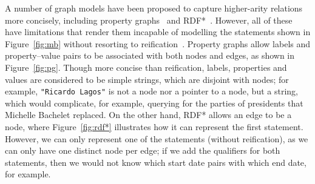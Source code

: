 A number of graph models have been proposed to capture higher-arity relations more concisely, including property graphs~\cite{FrancisGGLLMPRS18} and RDF*~\cite{Hartig17}. However, all of these have limitations that render them incapable of modelling the statements shown in Figure~\ref{fig:mb} without resorting to reification~\cite{HoganRRS19}. Property graphs allow labels and property--value pairs to be associated with both nodes and edges, as shown in Figure~\ref{fig:pg}. Though more concise than reification, labels, properties and values are considered to be simple strings, which are disjoint with nodes; for example, \texttt{"Ricardo Lagos"} is not a node nor a pointer to a node, but a string, which would complicate, for example, querying for the parties of presidents that Michelle Bachelet replaced. On the other hand, RDF* allows an edge to be a node, where Figure~\ref{fig:rdf*} illustrates how it can represent the first statement. However,  we can only represent one of the statements (without reification), as we can only have one distinct node per edge; if we add the qualifiers for both statements, then we would not know which start date pairs with which end date, for example. %


